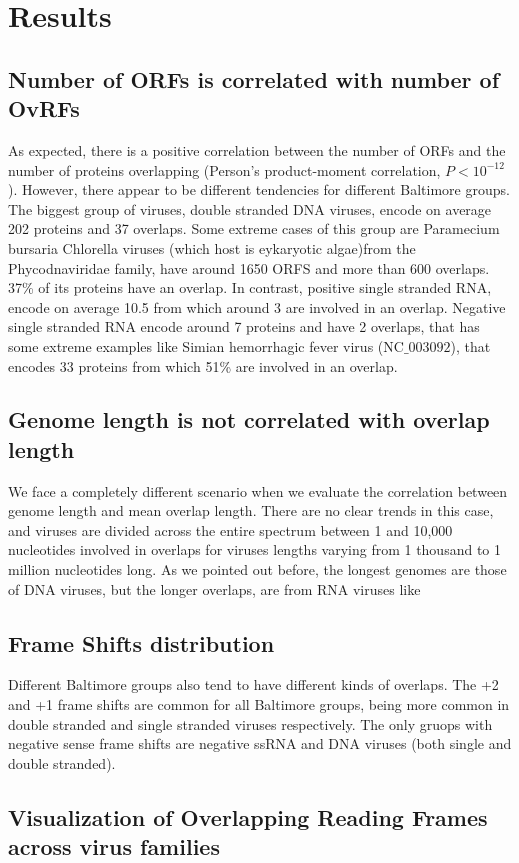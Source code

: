 \documentclass[12pt]{article}
\begin{document}
\section{Results}
\subsection{Number of ORFs is correlated with number of OvRFs}
As expected, there is a positive correlation between the number of ORFs and the number of proteins overlapping (Person's product-moment correlation, $P<10^{-12}$).
However, there appear to be different tendencies for different Baltimore groups. 
The biggest group of viruses, double stranded DNA viruses, encode on average 202 proteins and 37 overlaps. 
Some extreme cases of this group are  Paramecium bursaria Chlorella viruses (which host is eykaryotic algae)from the Phycodnaviridae family, have around 1650 ORFS and  more than 600 overlaps.
37\% of its proteins have an overlap. 
In contrast, positive single stranded RNA, encode on average 10.5 from which around 3 are involved in an overlap. 
Negative single stranded RNA encode around 7 proteins and have 2 overlaps, that has some extreme examples like Simian hemorrhagic fever virus (NC$\_003092$), that encodes 33 proteins from which 51\% are involved in an overlap. 

\subsection{Genome length is not correlated with overlap length}
We face a completely different scenario when we evaluate the correlation between genome length and mean overlap length.
There are no clear trends in this case, and viruses are divided across the entire spectrum between 1 and 10,000 nucleotides involved in overlaps for viruses lengths varying from 1 thousand to 1 million nucleotides long.
As we pointed out before, the longest genomes are those of DNA viruses, but the longer overlaps, are from RNA viruses like 
    
\subsection{Frame Shifts distribution}
Different Baltimore groups also tend to have different kinds of overlaps. 
The +2 and +1 frame shifts are common for all Baltimore groups, being more common in double stranded and single stranded viruses respectively. 
The only gruops with negative sense frame shifts are negative ssRNA and DNA viruses (both single and double stranded).

\subsection{Visualization of Overlapping Reading Frames across virus families}
\newpage


\end{document}
